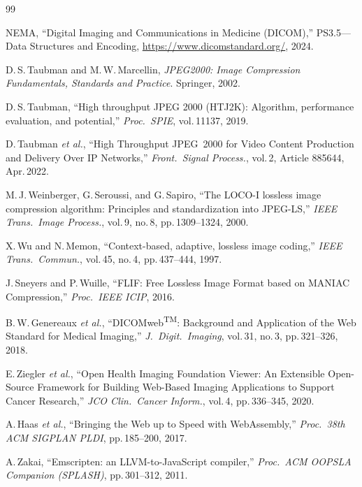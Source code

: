 \documentclass[journal]{IEEEtran}
\begin{document}
\begin{thebibliography}{99}

NEMA, ``Digital Imaging and Communications in Medicine (DICOM),''
PS3.5---Data Structures and Encoding,
\url{https://www.dicomstandard.org/}, 2024.

D.\,S.\,Taubman and M.\,W.\,Marcellin,
\textit{JPEG2000: Image Compression Fundamentals, Standards and Practice}.
Springer, 2002.

D.\,S.\,Taubman, ``High throughput JPEG 2000 (HTJ2K): Algorithm, performance
evaluation, and potential,'' \textit{Proc.\ SPIE}, vol.\,11137, 2019.

D.\,Taubman \textit{et al.},
``High Throughput JPEG~2000 for Video Content Production and Delivery Over IP
Networks,''
\textit{Front.\ Signal Process.}, vol.\,2, Article 885644, Apr.\,2022.

M.\,J.\,Weinberger, G.\,Seroussi, and G.\,Sapiro,
``The LOCO-I lossless image compression algorithm: Principles and
standardization into JPEG-LS,''
\textit{IEEE Trans.\ Image Process.}, vol.\,9, no.\,8, pp.\,1309--1324, 2000.

X.\,Wu and N.\,Memon,
``Context-based, adaptive, lossless image coding,''
\textit{IEEE Trans.\ Commun.}, vol.\,45, no.\,4, pp.\,437--444, 1997.

J.\,Sneyers and P.\,Wuille,
``FLIF: Free Lossless Image Format based on MANIAC Compression,''
\textit{Proc.\ IEEE ICIP}, 2016.

B.\,W.\,Genereaux \textit{et al.},
``DICOMweb\textsuperscript{TM}: Background and Application of the Web
Standard for Medical Imaging,''
\textit{J.\ Digit.\ Imaging}, vol.\,31, no.\,3, pp.\,321--326, 2018.

E.\,Ziegler \textit{et al.},
``Open Health Imaging Foundation Viewer: An Extensible Open-Source Framework
for Building Web-Based Imaging Applications to Support Cancer Research,''
\textit{JCO Clin.\ Cancer Inform.}, vol.\,4, pp.\,336--345, 2020.

A.\,Haas \textit{et al.},
``Bringing the Web up to Speed with WebAssembly,''
\textit{Proc.\ 38th ACM SIGPLAN PLDI}, pp.\,185--200, 2017.

A.\,Zakai,
``Emscripten: an LLVM-to-JavaScript compiler,''
\textit{Proc.\ ACM OOPSLA Companion (SPLASH)}, pp.\,301--312, 2011.


\end{thebibliography}
\end{document}
